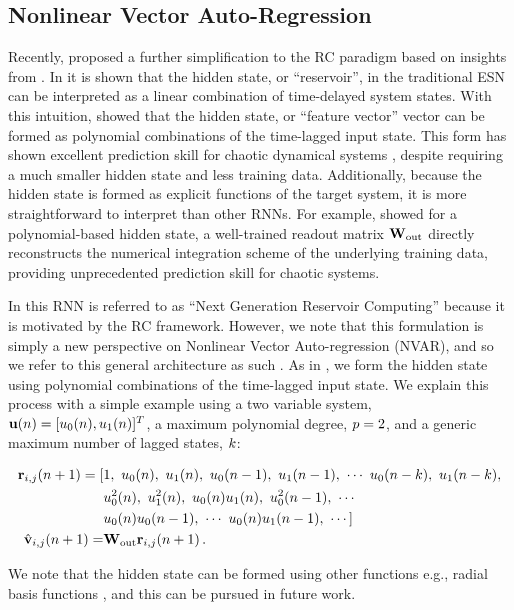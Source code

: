 \subsection{Nonlinear Vector Auto-Regression}
\label{subsec:nvar}

Recently, \citet{gauthier_next_2021} proposed a further simplification to the RC
paradigm based on insights from \citet{bollt_explaining_2021}.
In \citet{bollt_explaining_2021} it is shown that the hidden state, or
``reservoir'', in the traditional ESN can be interpreted as a linear combination
of time-delayed system states.
With this intuition, \citet{gauthier_next_2021} showed that the hidden state, or
``feature vector'' vector can be formed as polynomial combinations of the
time-lagged input state.
This form has shown excellent prediction skill for chaotic dynamical systems
\citep{barbosa_learning_2022,gauthier_next_2021}, despite requiring a much
smaller hidden state and less training data.
Additionally, because the hidden state is formed as explicit functions of the
target system, it is more straightforward to interpret than other RNNs.
For example,  showed for a polynomial-based hidden state, a
well-trained readout matrix $\mathbf{W}_\text{out}$ directly reconstructs the numerical integration scheme of
the underlying training data, providing unprecedented prediction skill for
chaotic systems.


In \citet{gauthier_next_2021} this RNN is referred to as ``Next Generation
Reservoir Computing'' because it is motivated by the RC framework.
However, we note that this formulation is simply a new perspective on Nonlinear
Vector Auto-regression (NVAR), and so we refer to this general architecture as
such .
As in \citet{gauthier_next_2021}, we form the hidden state using
polynomial combinations of the time-lagged input state.
We explain this process with a simple example using a two variable system,
$\mathbf{u}(n) = [u_0(n), u_1(n)]^T$,
a maximum polynomial degree,
$p=2$, and a generic maximum number of lagged states, $k$:
\begin{linenomath*}\begin{equation}
    \begin{aligned}
        \mathbf{r}_{i,j}(n+1)
        =
        [&1, \,\,
        u_0(n), \,\, u_1(n), \,\,
        u_0(n-1),\,\, u_1(n-1), \,\,
        \cdots \,\,
        u_0(n-k), \,\, u_1(n-k), \\
         &u_0^2(n), \,\, u_1^2(n), \,\, u_0(n)u_1(n), \,\,
        u_0^2(n-1), \,\, \cdots \\
         &u_0(n)u_0(n-1), \,\, \cdots \,\,
        u_0(n)u_1(n-1), \,\, \cdots
        ] \\
        \hat{\mathbf{v}}_{i,j}(n+1) = &\mathbf{W}_\text{out} \mathbf{r}_{i,j}(n+1) \, .
    \end{aligned}
\end{equation}\end{linenomath*}
We note that the hidden state can be formed using other functions e.g., radial
basis functions , and this can be pursued in future work.

